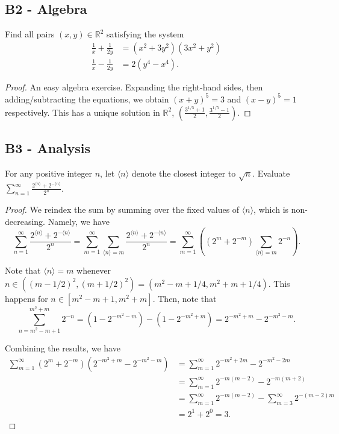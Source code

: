 \documentclass[11pt]{scrartcl}
\newcommand{\R}{\mathbb{R}}
\newcommand{\<}{\langle}
\renewcommand{\>}{\rangle}
\begin{document}
\subsection{B2 - Algebra} 
Find all pairs $(x, y) \in \R^2$ satisfying the system
\begin{align*}
\frac{1}{x} + \frac{1}{2y} &= (x^2 + 3y^2)(3x^2 + y^2) \\
\frac{1}{x} - \frac{1}{2y} &= 2(y^4 - x^4).
\end{align*}

\begin{proof}
An easy algebra exercise.  Expanding the right-hand sides, then adding/subtracting the equations, we obtain $(x+y)^5 = 3$ and $(x - y)^5 = 1$ respectively.  This has a unique solution in $\R^2$, $\left(\frac{3^{1/5} + 1}{2}, \frac{3^{1/5} - 1}{2} \right)$.
\end{proof}
\subsection{B3 - Analysis} 
For any positive integer $n$, let $\<n\>$ denote the closest integer to $\sqrt{n}$.  Evaluate $\sum_{n=1}^\infty \frac{2^{\<n\>} + 2^{-\<n\>}}{2^n}$.

\begin{proof}
We reindex the sum by summing over the fixed values of $\<n\>$, which is non-decreasing.  Namely, we have 
$$\sum_{n=1}^\infty \frac{2^{\<n\>} + 2^{-\<n\>}}{2^n} = \sum_{m=1}^\infty \sum_{\<n\> = m}  \frac{2^{\<n\>} + 2^{-\<n\>}}{2^n} = \sum_{m=1}^\infty \left((2^m + 2^{-m})\sum_{\<n\> = m} 2^{-n}\right).$$

Note that $\<n\> = m$ whenever $n \in ((m-1/2)^2, (m+1/2)^2) = (m^2 - m+ 1/4, m^2 + m + 1/4)$.  This happens for $n \in [m^2 - m + 1, m^2 + m ]$.  Then, note that $$\sum_{n=m^2 - m + 1}^{m^2 + m} 2^{-n} = (1 - 2^{-m^2 - m}) - (1 - 2^{-m^2 + m}) = 2^{-m^2 + m} - 2^{-m^2 - m}.$$

Combining the results, we have 
\begin{align*}
\sum_{m=1}^\infty (2^{m} + 2^{-m}) (2^{-m^2 + m} - 2^{-m^2 - m}) &= \sum_{m=1}^\infty 2^{-m^2 + 2m} - 2^{-m^2 - 2m} \\
&= \sum_{m=1}^\infty 2^{-m(m-2)} - 2^{-m(m+2)} \\
&= \sum_{m=1}^\infty 2^{-m(m-2)} -  \sum_{m=3}^\infty 2^{-(m-2)m}  \\
&= 2^{1} + 2^{0} = 3.
\end{align*}
\end{proof}
\end{document}
